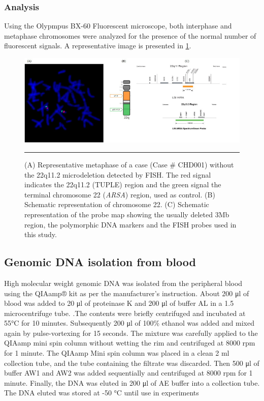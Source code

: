 \begin{refsection}
\subsubsection{Analysis}
Using the Olypmpus BX-60 Fluorescent microscope, both interphase and metaphase chromosomes were analyzed for the presence of the normal number of fluorescent signals. A representative image is presented in \cref{fig:2_4fishcase}.

\begin{figure}[!tb]
\centering
\includegraphics[width=\linewidth]{Figures/2_4fishcase.pdf} 
\rule{35em}{0.5pt}
\caption{(A) Representative metaphase of a case (Case \# CHD001) without the 22q11.2 microdeletion detected by FISH. The red signal indicates the 22q11.2 (TUPLE) region and the green signal the terminal chromosome 22 (\textit{ARSA}) region, used as control. (B) Schematic representation of chromosome 22. (C) Schematic representation of the probe map showing the usually deleted 3Mb region, the polymorphic DNA markers and the FISH probes used in this study.}
\label{fig:2_4fishcase}
\end{figure}

\subsection{Genomic DNA isolation from blood}
High molecular weight genomic DNA was isolated from the peripheral blood using the QIAamp® kit as per the manufacturer’s instruction. About 200 μl of blood was added to 20 μl of proteinase K and 200 μl of buffer AL in a 1.5 microcentrifuge tube. .The contents were briefly centrifuged and incubated at 55°C for 10 minutes. Subsequently 200 μl of 100\% ethanol was added and mixed again by pulse-vortexing for 15 seconds. The mixture was carefully applied to the QIAamp mini spin column without wetting the rim and centrifuged at 8000 rpm for 1 minute. The QIAamp Mini spin column was placed in a clean 2 ml collection tube, and the tube containing the filtrate was discarded. Then 500 μl of buffer AW1 and AW2 was added sequentially and centrifuged at 8000 rpm for 1 minute. Finally, the DNA was eluted in 200 μl of AE buffer into a collection tube. The DNA eluted was stored at -50 °C until use in experiments
 

\end{refsection}
